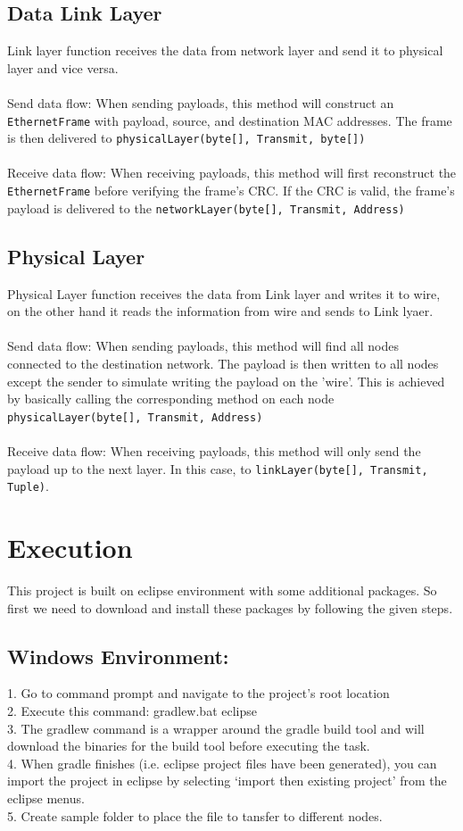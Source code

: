 \documentclass{scrartcl}
\begin{document}
\subsection{Data Link Layer}
Link layer function receives the data from network layer and send it to physical layer and vice versa. \\ \\
Send data flow:
When sending payloads, this method will construct an \texttt{EthernetFrame} with payload, source, and destination MAC addresses. The frame is then delivered to \texttt{physicalLayer(byte[], Transmit, byte[])} \\ \\
Receive data flow:
When receiving payloads, this method will first reconstruct the \texttt{EthernetFrame} before verifying the frame's CRC. If the CRC is valid, the frame's payload is delivered to the \texttt{networkLayer(byte[], Transmit, Address)}
\subsection{Physical Layer}
Physical Layer function receives the data from Link layer and writes it to wire, on the other hand it reads the information from wire and sends to Link lyaer.\\ \\
Send data flow:
When sending payloads, this method will find all nodes connected to the destination network. The payload is then written to all nodes except the sender to simulate writing the payload on the 'wire'. This is achieved by basically calling the corresponding method on each node \texttt{physicalLayer(byte[], Transmit, Address)} \\ \\ 
Receive data flow:
When receiving payloads, this method will only send the payload up to the next layer. In this case, to \texttt{linkLayer(byte[], Transmit, Tuple)}. 

\newpage
\section{Execution}
This project is built on eclipse environment with some additional packages. So first we need to download and install these packages by following the given steps.
\subsection{Windows Environment:}
1. Go to command prompt and navigate to the project's root location \\
2. Execute this command: gradlew.bat eclipse \\
3. The gradlew command is a wrapper around the gradle build tool and will download the binaries for the build tool before executing the task. \\
4. When gradle finishes (i.e. eclipse project files have been generated), you can import the project in eclipse by selecting ‘import then existing project’ from the eclipse menus. \\ 
5. Create sample folder to place the file to tansfer to different nodes.
\end{document}
